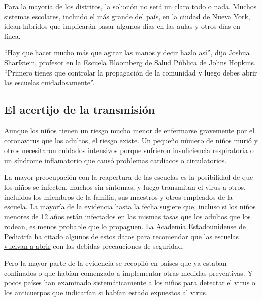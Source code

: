 Para la mayoría de los distritos, la solución no será un claro todo o
nada.
\href{https://bioethics.jhu.edu/research-and-outreach/projects/eschool-initiative/school-policy-tracker/}{Muchos
sistemas escolares}, incluido el más grande del país, en la ciudad de
Nueva York, idean híbridos que implicarán pasar algunos días en las
aulas y otros días en línea.

``Hay que hacer mucho más que agitar las manos y decir hazlo así'', dijo
Joshua Sharfstein, profesor en la Escuela Bloomberg de Salud Pública de
Johns Hopkins. ``Primero tienes que controlar la propagación de la
comunidad y luego debes abrir las escuelas cuidadosamente''.

\hypertarget{el-acertijo-de-la-transmisiuxf3n}{%
\subsection{El acertijo de la
transmisión}\label{el-acertijo-de-la-transmisiuxf3n}}

Aunque los niños tienen un riesgo mucho menor de enfermarse gravemente
por el coronavirus que los adultos, el riesgo existe. Un pequeño número
de niños murió y otros necesitaron cuidados intensivos porque
\href{https://www.nytimes3xbfgragh.onion/2020/04/06/health/coronavirus-children-us.html}{sufrieron
insuficiencia respiratoria} o un
\href{https://www.nytimes3xbfgragh.onion/es/2020/05/18/espanol/sindrome-coronavirus-ninos.html}{síndrome
inflamatorio} que causó problemas cardíacos o circulatorios.

La mayor preocupación con la reapertura de las escuelas es la
posibilidad de que los niños se infecten, muchos sin síntomas, y luego
transmitan el virus a otros, incluidos los miembros de la familia, sus
maestros y otros empleados de la escuela. La mayoría de la evidencia
hasta la fecha sugiere que, incluso si los niños menores de 12 años
están infectados en las mismas tasas que los adultos que los rodean, es
menos probable que lo propaguen. La Academia Estadounidense de Pediatría
ha citado algunos de estos datos para
\href{https://services.aap.org/en/pages/2019-novel-coronavirus-covid-19-infections/clinical-guidance/covid-19-planning-considerations-return-to-in-person-education-in-schools/}{recomendar
que las escuelas vuelvan a abrir} con las debidas precauciones de
seguridad.

Pero la mayor parte de la evidencia se recopiló en países que ya estaban
confinados o que habían comenzado a implementar otras medidas
preventivas. Y pocos países han examinado sistemáticamente a los niños
para detectar el virus o los anticuerpos que indicarían si habían estado
expuestos al virus.

